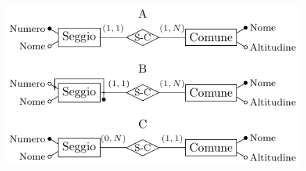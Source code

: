 \documentclass{article}
\numberwithin{equation}{subsection}
\begin{document}
\begin{figure}[H]%
    \centering%
    \includegraphics[scale=1.25]{schema_elezioni_25-11-24.pdf}%
\end{figure}
\end{document}
